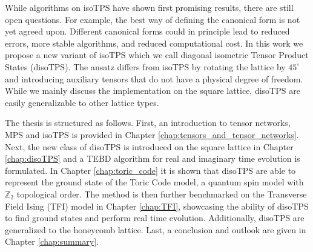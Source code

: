 While algorithms on isoTPS have shown first promising results, there are still open questions. For example, the best way of defining the canonical form is not yet agreed upon. Different canonical forms could in principle lead to reduced errors, more stable algorithms, and reduced computational cost. In this work we propose a new variant of isoTPS which we call diagonal isometric Tensor Product States (disoTPS). The ansatz differs from isoTPS by rotating the lattice by $45^\circ$ and introducing auxiliary tensors that do not have a physical degree of freedom. While we mainly discuss the implementation on the square lattice, disoTPS are easily generalizable to other lattice types.
\par
The thesis is structured as follows. First, an introduction to tensor networks, MPS and isoTPS is provided in Chapter \ref{chap:tensors_and_tensor_networks}. Next, the new class of disoTPS is introduced on the square lattice in Chapter \ref{chap:disoTPS} and a TEBD algorithm for real and imaginary time evolution is formulated. In Chapter \ref{chap:toric_code} it is shown that disoTPS are able to represent the ground state of the Toric Code model, a quantum spin model with $\mathbb{Z}_2$ topological order. The method is then further benchmarked on the Transverse Field Ising (TFI) model in Chapter \ref{chap:TFI}, showcasing the ability of disoTPS to find ground states and perform real time evolution. Additionally, disoTPS are generalized to the honeycomb lattice. Last, a conclusion and outlook are given in Chapter \ref{chap:summary}.